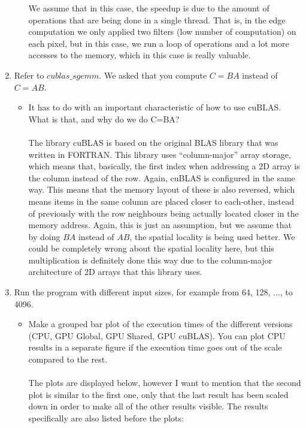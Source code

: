 \documentclass[english]{exam}
\begin{document}
\begin{enumerate}
\begin{enumerate}
    We assume that in this case, the speedup is due to the amount of operations that are being done in a single thread. That is, in the edge computation we only applied two filters (low number of computation) on each pixel, but in this case, we run a loop of operations and a lot more accesses to the memory, which in this case is really valuable.
  \end{enumerate}
\item Refer to $cublas\_sgemm$. We asked that you compute $C=BA$ instead of $C=AB$.
  \begin{itemize}
  \item It has to do with an important characteristic of how to use cuBLAS. What is that, and why do we do C=BA? \\\\
    The library cuBLAS is based on the original BLAS library that was written in FORTRAN. This library uses ``column-major'' array storage, which means that, basically, the first index when addressing a 2D array is the column instead of the row. Again, cuBLAS is configured in the same way. This means that the memory layout of these is also reversed, which means items in the same column are placed closer to each-other, instead of previously with the row neighbours being actually located closer in the memory address. Again, this is just an assumption, but we assume that by doing $BA$ instead of $AB$, the spatial locality is being used better. We could be completely wrong about the spatial locality here, but this multiplication is definitely done this way due to the column-major architecture of 2D arrays that this library uses.
  \end{itemize}
\item Run the program with different input sizes, for example from 64, 128, ..., to 4096.
  \begin{itemize}
  \item Make a grouped bar plot of the execution times of the different versions (CPU, GPU Global, GPU Shared, GPU cuBLAS). You can plot CPU results in a separate figure if the execution time goes out of the scale compared to the rest. \\\\

    The plots are displayed below, however I want to mention that the second plot is similar to the first one, only that the last result has been scaled down in order to make all of the other results visible. The results specifically are also listed before the plots:


\end{itemize}
\end{enumerate}
\end{document}
